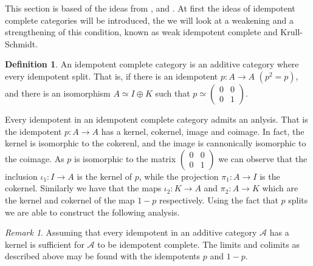 \documentclass[11pt]{article}
\theoremstyle{definition}
\newtheorem{definition}{Definition}[section]
\theoremstyle{remark}
\newtheorem*{remark}{Remark}
\begin{document}
            This section is based of the ideas from \cite{buhler}, \cite{Kra12} and \cite{Rei95}. At first the ideas of idempotent complete categories will be introduced, the we will look at a weakening and a strengthening of this condition, known as weak idempotent complete and Krull-Schmidt.

            \begin{definition}
                An idempotent complete category is an additive category where every idempotent split. That is, if there is an idempotent $p:A\rightarrow A$ $(p^2=p)$, and there is an isomorphism $A\simeq I\oplus K$ such that $p\simeq \begin{pmatrix} 0 & 0 \\ 0 & 1 \end{pmatrix}$. 
            \end{definition}

            Every idempotent in an idempotent complete category admits an anlysis. That is the idempotent $p:A\rightarrow A$ has a kernel, cokernel, image and coimage. In fact, the kernel is isomorphic to the cokerenl, and the image is cannonically isomorphic to the coimage. As $p$ is isomorphic to the matrix $\begin{pmatrix} 0 & 0 \\ 0 & 1 \end{pmatrix}$ we can observe that the inclusion $\iota_1:I\rightarrow A$ is the kernel of $p$, while the projection $\pi_1:A\rightarrow I$ is the cokernel. Similarly we have that the maps $\iota_2:K\rightarrow A$ and $\pi_2:A\rightarrow K$ which are the kernel and cokernel of the map $1-p$ respectively. Using the fact that $p$ splits we are able to construct the following analysis.

            \begin{center}
            \end{center}

            \begin{remark}
                Assuming that every idempotent in an additive category $\mathcal{A}$ has a kernel is sufficient for $\mathcal{A}$ to be idempotent complete. The limits and colimits as described above may be found with the idempotents $p$ and $1-p$.
            \end{remark}
\end{document}
